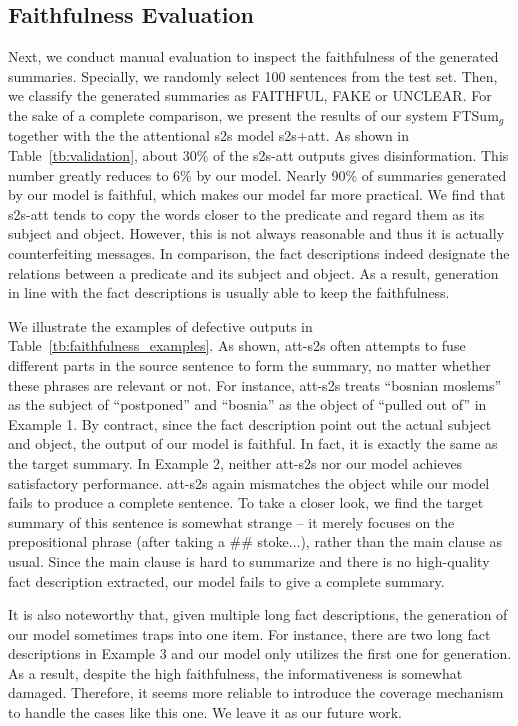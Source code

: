 \documentclass[letterpaper]{article} \usepackage{aaai18}  \usepackage{times}  \usepackage{helvet}  \usepackage{courier}  \usepackage{url}  \usepackage{graphicx}  \usepackage{amsfonts}
\begin{document}
	\subsection{Faithfulness Evaluation}
	Next, we conduct manual evaluation to inspect the faithfulness of the generated summaries.
	Specially, we randomly select 100 sentences from the test set.
	Then, we classify the generated summaries as FAITHFUL, FAKE or UNCLEAR.
	For the sake of a complete comparison, we present the results of our system FTSum$_g$ together with the the attentional s2s model s2s+att.
	As shown in Table~\ref{tb:validation}, about 30\% of the s2s-att outputs gives disinformation.
	This number greatly reduces to 6\% by our model.
	Nearly 90\% of summaries generated by our model is faithful, which makes our model far more practical.
	We find that s2s-att tends to copy the words closer to the predicate and regard them as its subject and object.
	However, this is not always reasonable and thus it is actually counterfeiting messages. 
	In comparison, the fact descriptions indeed designate the relations between a predicate and its subject and object.
	As a result, generation in line with the fact descriptions is usually able to keep the faithfulness.
	
	We illustrate the examples of defective outputs in Table~\ref{tb:faithfulness_examples}.
	As shown, att-s2s often attempts to fuse different parts in the source sentence to form the summary, no matter whether these phrases are relevant or not.
	For instance, att-s2s treats ``bosnian moslems'' as the subject of ``postponed'' and ``bosnia'' as the object of ``pulled out of'' in Example 1.
	By contract, since the fact description point out the actual subject and object, the output of our model is faithful.
	In fact, it is exactly the same as the target summary. 
	In Example 2, neither att-s2s nor our model achieves satisfactory performance.
	att-s2s again mismatches the object while our model fails to produce a complete sentence.
	To take a closer look, we find the target summary of this sentence is somewhat strange -- it merely focuses on the prepositional phrase (after taking a \#\# stoke...), rather than the main clause as usual.
	Since the main clause is hard to summarize and there is no high-quality fact description extracted, our model fails to give a complete summary.
	
	It is also noteworthy that, given multiple long fact descriptions, the generation of our model sometimes traps into one item.
	For instance, there are two long fact descriptions in Example 3 and our model only utilizes the first one for generation.
	As a result, despite the high faithfulness, the informativeness is somewhat damaged.
	Therefore, it seems more reliable to introduce the coverage mechanism~\cite{see2017get} to handle the cases like this one.
	We leave it as our future work.
\end{document}
